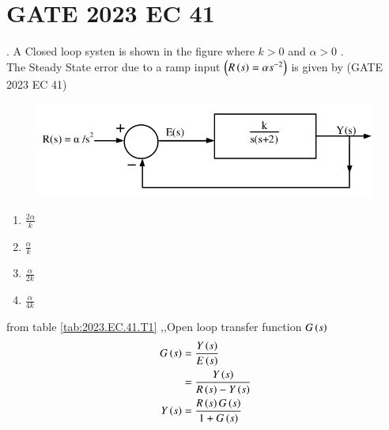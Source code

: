 \documentclass[journal,12pt,twocolumn]{IEEEtran}
\begin{document}


\vspace{3cm}

\title{}
\author{EE23BTECH11024 - G.Karthik Yadav$^{*}$
}
\maketitle
\newpage
\bigskip

\section*{GATE 2023 EC 41}
. \hspace{2pt} A Closed loop systen is shown in the figure where $k>0$ and $\alpha>0$ .\\
The Steady State error due to a ramp input $\left(R\left(s\right) = \alpha s^{-2}\right)$ is given by \hfill{(GATE 2023 EC 41)}

\begin{figure}[ht]
\centering
    \includegraphics[width=1.0\linewidth]{figs/question.png}
    \label{fig: 23.EC.41.24.1}
\end{figure}

\begin{enumerate}
\item $\frac{2\alpha}{k}$
\item $\frac{\alpha}{k}$
\item $\frac{\alpha}{2k}$
\item $\frac{\alpha}{4k}$
\end{enumerate}

\solution


from table \ref{tab:2023.EC.41.T1}
,,Open loop transfer function $G\left(s\right)$\\
\begin{align}
	G\left(s\right) &= \frac{Y\left(s\right)}{E\left(s\right)} \label{24.2023.EC.41.1} \\
        &= \frac{Y\left(s\right)}{R\left(s\right) - Y\left(s\right)} \\
        Y\left(s\right) &= \frac{R\left(s\right)G\left(s\right)}{1 + G\left(s\right)} \label{24.2023.EC.41.2}
\end{align}
\end{document}
